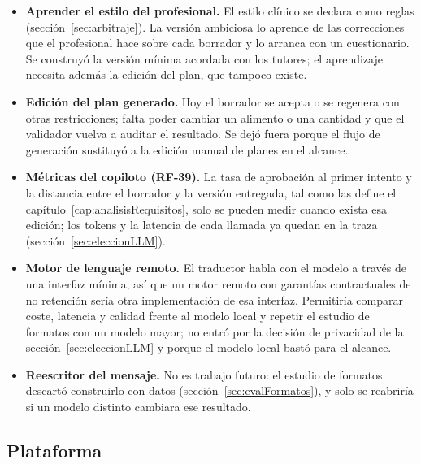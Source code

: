 \begin{itemize}
    \item \textbf{Aprender el estilo del profesional.} El estilo clínico se declara como reglas (sección~\ref{sec:arbitraje}). La versión ambiciosa lo aprende de las correcciones que el profesional hace sobre cada borrador y lo arranca con un cuestionario. Se construyó la versión mínima acordada con los tutores; el aprendizaje necesita además la edición del plan, que tampoco existe.
    \item \textbf{Edición del plan generado.} Hoy el borrador se acepta o se regenera con otras restricciones; falta poder cambiar un alimento o una cantidad y que el validador vuelva a auditar el resultado. Se dejó fuera porque el flujo de generación sustituyó a la edición manual de planes en el alcance.
    \item \textbf{Métricas del copiloto (RF-39).} La tasa de aprobación al primer intento y la distancia entre el borrador y la versión entregada, tal como las define el capítulo~\ref{cap:analisisRequisitos}, solo se pueden medir cuando exista esa edición; los tokens y la latencia de cada llamada ya quedan en la traza (sección~\ref{sec:eleccionLLM}).
    \item \textbf{Motor de lenguaje remoto.} El traductor habla con el modelo a través de una interfaz mínima, así que un motor remoto con garantías contractuales de no retención sería otra implementación de esa interfaz. Permitiría comparar coste, latencia y calidad frente al modelo local y repetir el estudio de formatos con un modelo mayor; no entró por la decisión de privacidad de la sección~\ref{sec:eleccionLLM} y porque el modelo local bastó para el alcance.
    \item \textbf{Reescritor del mensaje.} No es trabajo futuro: el estudio de formatos descartó construirlo con datos (sección~\ref{sec:evalFormatos}), y solo se reabriría si un modelo distinto cambiara ese resultado.
\end{itemize}

\subsection{Plataforma}
\label{sec:futuroPlataforma}

